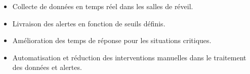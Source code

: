 \begin{itemize}
    \item Collecte de données en temps réel dans les salles de réveil.
    \item Livraison des alertes en fonction de seuils définis.
    \item Amélioration des temps de réponse pour les situations critiques.
    \item Automatisation et réduction des interventions manuelles dans le traitement des données et alertes.
\end{itemize}